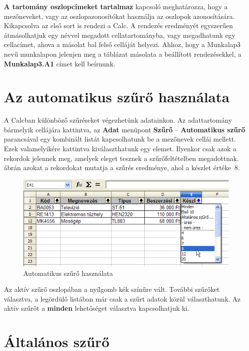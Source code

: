 \textbf{A tartomány oszlopcímeket tartalmaz} kapcsoló
meghatározza, hogy a mezőneveket, vagy az oszlopazonosítókat
használja az oszlopok azonosítására. Kikapcsolva az első
sort is rendezi a Calc. A rendezés eredményét egyszerűen
átmásolhatjuk egy névvel megadott cellatartományba, vagy
megadhatunk egy cellacímet, ahova a másolat bal felső
celláját helyezi. Ahhoz, hogy a Munkalap3 nevű munkalapon
jelenjen meg a táblázat másolata a beállított
rendezésekkel, a \textbf{Munkalap3.A1} címet kell beírnunk.


\section{Az automatikus szűrő használata}

A Calcban különböző szűréseket végezhetünk
adatainkon. Az adattartomány bármelyik cellájára kattintva, az
\textbf{Adat} menüpont \textbf{Szűrő} -- \textbf{Automatikus
szűrő} parancsával egy kombinált listát kapcsolhatunk be
a mezőnevek cellái mellett. Ezek valamelyikére kattintva
kiválaszthatunk egy elemet. Ilyenkor csak azok a rekordok jelennek
meg, amelyek eleget tesznek a szűrőfeltételben megadottnak.
 ábrán azokat a rekordokat mutatja
a szűrés eredménye, ahol a készlet értéke~8.

\begin{figure}[!h]
\begin{center}
\includegraphics[width=13.524cm]{oocalcv1-img114.png}
\caption{Automatikus szűrő használata}\label{AutomatikusSzűrő}
\end{center}
\end{figure}

Az aktív szűrő oszlopában a nyílgomb kék színűre
vált. További szűrőket választva, a legördülő
listában már csak a szűrt adatok közül választhatunk. Az
aktív szűrőt a \textbf{minden} lehetőséget
választva kapcsolhatjuk ki.


\section{Általános szűrő}

